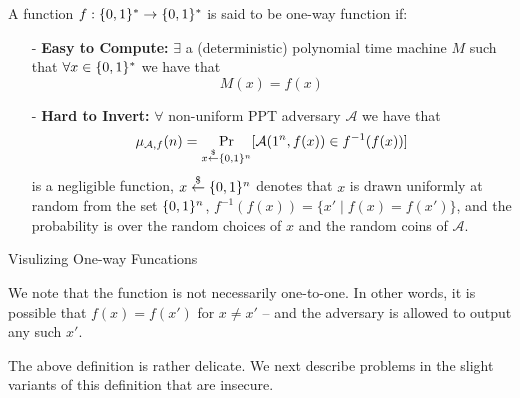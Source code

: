 \begin{definition}
A function $f : \{0,1\}^{*} \rightarrow \{0,1\}^{*}$ is said to be one-way function if:
\begin{itemize}
\item[-] \textbf{Easy to Compute:} $\exists$ a (deterministic) polynomial time machine $M$ such that $\forall x \in \{0,1\}^{*}$ we have that \[M(x) = f(x)\]

\item[-] \textbf{Hard to Invert:} $\forall$ non-uniform PPT adversary $\mathcal{A}$ we have that
    \begin{equation}\label{eq:owf}
    \mu_{\mathcal{A},f}(n) = \Pr_{x \stackrel{\$}{\leftarrow} \{0,1\}^{n}}[ \mathcal{A}(1^n, f(x)) \in f^{-1}(f(x))]
     \end{equation}
     is a negligible function,  $x \overset{\$}{\leftarrow} \{0,1\}^{n}$ denotes that $x$ is drawn uniformly at random from the set $\{0,1\}^{n}$, $f^{-1}(f(x)) = \{x' \mid f(x) = f(x')\}$, and the probability is over the random choices of $x$ and the random coins of $\mathcal{A}$\footnotemark.
\end{itemize}
\end{definition}

\begin{marginfigure}[-10cm]
\caption{Visulizing One-way Funcations}
\label{fig:owf}
\end{marginfigure}



We note that the function is not necessarily one-to-one. In other words, it is possible that $f(x) = f(x')$ for $x \neq x'$ -- and the adversary is allowed to output any such $x'$.

The above definition is rather delicate. We next describe problems in the slight variants of this definition that are insecure.

